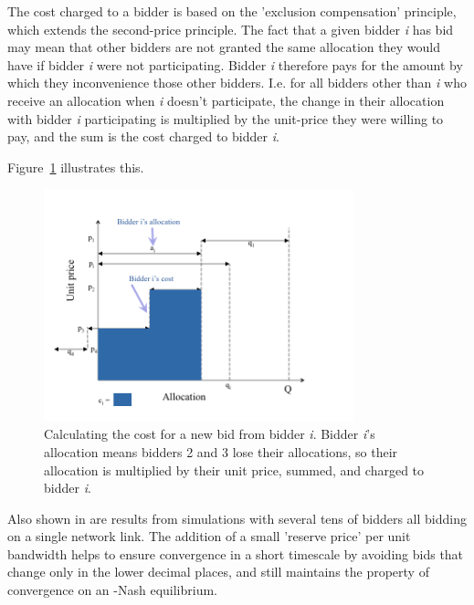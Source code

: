 The cost charged to a bidder is based on the 'exclusion compensation' principle, which extends the second-price principle. The fact that a given bidder {\it i} has bid may mean that other bidders are not granted the same allocation they would have if bidder {\it i} were not participating. Bidder {\it i} therefore pays for the amount by which they inconvenience those other bidders. I.e. for all bidders other than {\it i} who receive an allocation when {\it i} doesn't participate, the change in their allocation with bidder {\it i} participating is multiplied by the unit-price they were willing to pay, and the sum is the cost charged to bidder {\it i}.

Figure~\ref{fig:cost} illustrates this.

\begin{figure}[h]
 \centering
   \includegraphics[width=0.8\textwidth]{cost}
       \caption{Calculating the cost for a new bid from bidder {\it i}. Bidder {\it i}'s allocation means bidders 2 and 3 lose their allocations, so their allocation is multiplied by their unit price, summed, and charged to bidder {\it i}.}
 \label{fig:cost}
\end{figure}

Also shown in \cite{PSP} are results from simulations with several tens of bidders all bidding on a single network link. The addition of a small 'reserve price' per unit bandwidth helps to ensure convergence in a short timescale by avoiding bids that change only in the lower decimal places, and still maintains the property of convergence on an \textepsilon -Nash equilibrium.